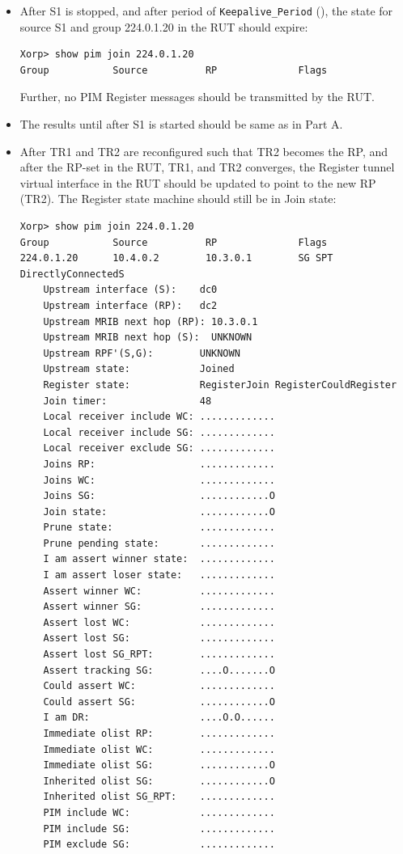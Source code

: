 \documentclass[11pt]{report}
\begin{document}
\begin{itemize}
  \item After S1 is stopped, and after period of \verb=Keepalive_Period=
  ({\PimsmKeepalivePeriod}), the state for source S1 and group 224.0.1.20
  in the RUT should expire:

\begin{verbatim}
Xorp> show pim join 224.0.1.20
Group           Source          RP              Flags
\end{verbatim}

  Further, no PIM Register messages should be transmitted by the RUT.

\end{itemize}


\begin{itemize}

  \item The results until after S1 is started should be same as in Part A.

  \item After TR1 and TR2 are reconfigured such that TR2 becomes the RP,
  and after the RP-set in the RUT, TR1, and TR2 converges, the Register tunnel
  virtual interface in the RUT should be updated to point to the new RP (TR2).
  The Register state machine should still be in Join state:

\begin{verbatim}
Xorp> show pim join 224.0.1.20
Group           Source          RP              Flags
224.0.1.20      10.4.0.2        10.3.0.1        SG SPT DirectlyConnectedS 
    Upstream interface (S):    dc0
    Upstream interface (RP):   dc2
    Upstream MRIB next hop (RP): 10.3.0.1
    Upstream MRIB next hop (S):  UNKNOWN
    Upstream RPF'(S,G):        UNKNOWN
    Upstream state:            Joined 
    Register state:            RegisterJoin RegisterCouldRegister 
    Join timer:                48
    Local receiver include WC: .............
    Local receiver include SG: .............
    Local receiver exclude SG: .............
    Joins RP:                  .............
    Joins WC:                  .............
    Joins SG:                  ............O
    Join state:                ............O
    Prune state:               .............
    Prune pending state:       .............
    I am assert winner state:  .............
    I am assert loser state:   .............
    Assert winner WC:          .............
    Assert winner SG:          .............
    Assert lost WC:            .............
    Assert lost SG:            .............
    Assert lost SG_RPT:        .............
    Assert tracking SG:        ....O.......O
    Could assert WC:           .............
    Could assert SG:           ............O
    I am DR:                   ....O.O......
    Immediate olist RP:        .............
    Immediate olist WC:        .............
    Immediate olist SG:        ............O
    Inherited olist SG:        ............O
    Inherited olist SG_RPT:    .............
    PIM include WC:            .............
    PIM include SG:            .............
    PIM exclude SG:            .............
\end{verbatim}


\end{itemize}
\end{document}
